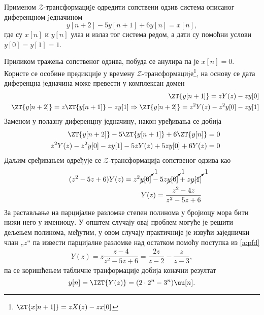 \PID 
Применом $\mathcal{Z}$-трансформациjе одредити сопствени одзив система описаног диференцном jедначином
$$
    y[n+2] - 5 y[n + 1] + 6 y[n] = x[n],
$$
где су $x[n]$ и $y[n]$ улаз и излаз тог система редом, а дати су помоћни услови $y[0] = y[1] = 1$.

\RESENJE

Приликом тражења сопственог одзива, побуда се анулира па је $x[n] = 0$.
Користе се особине предикције у времену $\mathcal{Z}$-трансформациjе\footnote{
    $\ZT{x[n+1]} = z X(z) - z x[0]$
}, на основу се дата диференцна једначина може превести у комплексан домен 
\begin{eqnarray}
    &&
    \ZT{y[n+1]} = z Y(z) - z y[0] 
    \\
    &&
    \ZT{y[n+2]} = z \ZT{y[n+1]}  - z y[1] 
    \Rightarrow
    \ZT{y[n+2]} = z^2 Y(z) - z^2 y[0]  - z y[1] 
\end{eqnarray}
Заменом у полазну диференцну једначину, након уређивања се добија 
\begin{eqnarray}
    && 
    \ZT{y[n+2]} - 5 \ZT{y[n + 1]} + 6 \ZT{y[n]} = 0 \\
    && 
    z^2 Y(z) - z^2 y[0]  - z y[1] 
    -5z Y(z) + 5z y[0]
    + 6 Y(z) = 0 \\
\end{eqnarray}
Даљим сређивањем одређује се $\mathcal{Z}$-трансформација сопственог одзива као
\begin{eqnarray}
    && (z^2 - 5z + 6) Y(z) = z^2 \cancelto{1}{y[0]} - 5z \cancelto{1}{y[0]} + z \cancelto{1}{y[1]}  \\
    && Y(z) = \dfrac{z^2 - 4z}{z^2 - 5z + 6}
\end{eqnarray}
За растављање на парцијалне разломке степен полинома у бројиоцу мора бити нижи него у имениоцу. У општем случају овај проблем 
могуће је решити дељењем полинома, међутим, у овом случају практичније је извући заједнички члан „$z$“ па извести парцијалне разломке 
над остатком помоћу поступка из \ref{a:pfd}
\begin{eqnarray}
    Y(z) = z \dfrac{z - 4}{z^2 - 5z + 6} = \dfrac{2z}{z - 2} - \dfrac{z}{z - 3},
\end{eqnarray}
па се коришћењем табличне транформације  добија коначни резултат 
\begin{equation}
    y[n] = \IZT{Y(z)} = (2 \cdot 2^n - 3^n) \uu[n].
\end{equation}